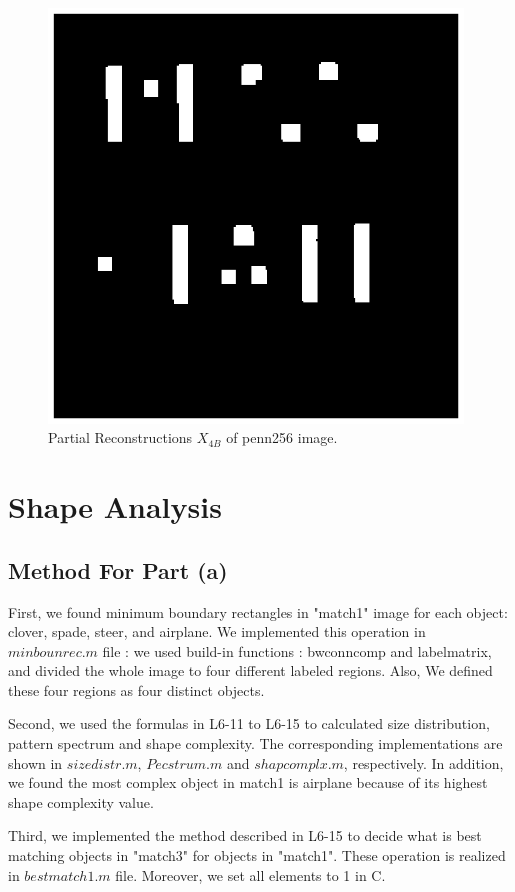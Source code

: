 \documentclass[paper=a4, fontsize=11pt]{scrartcl}
\begin{document}
\begin{figure}
	\centering
	\includegraphics[width=11cm]{X4Bpenn.eps}
	\caption{Partial Reconstructions $X_{4B}$ of penn256 image.}
	\label{fig:14}
\end{figure}

\section{Shape Analysis}

\subsection{ Method For Part (a) }

First, we found minimum boundary rectangles in "match1" image for each object: clover, spade, steer, and airplane. We implemented this operation in $minbounrec.m$ file : we used build-in functions : bwconncomp and labelmatrix, and divided the whole image to four different labeled regions.  Also, We defined these four regions as four distinct objects. 

	Second, we used the formulas in L6-11 to L6-15 to calculated size distribution, pattern spectrum and shape complexity. The corresponding implementations are shown in $sizedistr.m$, $Pecstrum.m$ and $shapcomplx.m$, respectively. In addition, we found the most complex object in match1 is airplane because of its highest shape complexity value.

	Third, we implemented the method described in L6-15 to decide what is best matching objects in "match3"  for objects in "match1". These operation is realized in $bestmatch1.m$ file.  Moreover, we set all elements to 1 in C.
\end{document}

